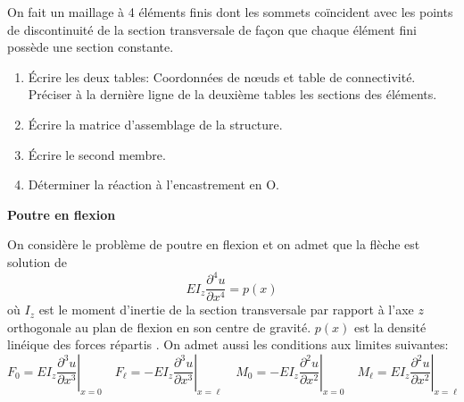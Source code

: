 \documentclass{article}
\begin{document}
On fait un maillage à 4 éléments finis dont les sommets coïncident avec les points de discontinuité de la section transversale de façon que chaque élément fini possède une section constante. 
\begin{enumerate}
\item Écrire les deux tables: Coordonnées de nœuds et table de connectivité. Préciser à la dernière ligne de la deuxième tables les sections des éléments.
\item Écrire la matrice d'assemblage de la structure. 
\item Écrire le second membre.
\item  Déterminer la réaction à l'encastrement en O.
\end{enumerate}
{\bf Poutre en flexion}
\begin{center}
\end{center}
On considère le problème de poutre en flexion et on admet que la flèche est solution de
\[EI_z\frac{\partial^4 u}{\partial x^4}=p(x)\]
où $I_z$ est le moment d'inertie de la section transversale par rapport à l'axe $z$ orthogonale au plan de flexion en son centre de gravité. $p(x)$ est la densité linéique des forces répartis . On admet aussi les conditions aux limites suivantes:
\[
F_0=\left.EI_z\frac{\partial^3 u}{\partial x^3}\right|_{x=0}\quad F_\ell=-\left.EI_z\frac{\partial^3 u}{\partial x^3}\right|_{x=\ell}\quad M_0=-\left.EI_z\frac{\partial^2 u}{\partial x^2}\right|_{x=0}\quad M_\ell=\left.EI_z\frac{\partial^2 u}{\partial x^2}\right|_{x=\ell}
\]
\end{document}
